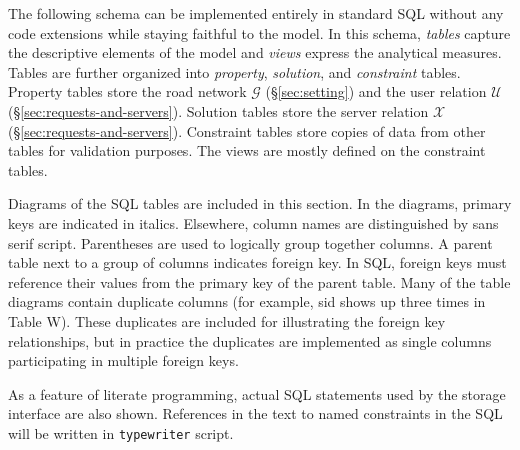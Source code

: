 \documentclass{article}
\theoremstyle{definition}                   %
\begin{document}
The following schema can be implemented entirely in standard SQL without any
code extensions while staying faithful to the model.  In this schema,
\textit{tables} capture the descriptive elements of the model and
\textit{views} express the analytical measures.  Tables are further organized
into \emph{property}, \emph{solution}, and \emph{constraint} tables.  Property
tables store the road network $\mathcal{G}$ (\S\ref{sec:setting}) and the user
relation $\mathcal{U}$ (\S\ref{sec:requests-and-servers}).  Solution tables
store the server relation $\mathcal{X}$ (\S\ref{sec:requests-and-servers}).
Constraint tables store copies of data from other tables for validation
purposes.  The views are mostly defined on the constraint tables.

Diagrams of the SQL tables are included in this section. In the diagrams,
primary keys are indicated in italics. Elsewhere, column names are
distinguished by \textsf{sans serif} script.  Parentheses are used to logically
group together columns.  A parent table next to a group of columns indicates
foreign key. In SQL, foreign keys must reference their values from the primary
key of the parent table. Many of the table diagrams contain duplicate columns
(for example, \textsf{sid} shows up three times in Table W).  These duplicates
are included for illustrating the foreign key relationships, but in practice
the duplicates are implemented as single columns participating in multiple
foreign keys.

As a feature of literate programming, actual SQL statements used by the storage
interface are also shown. References in the text to named constraints in the
SQL will be written in {\tt{}typewriter} script.
\end{document}
